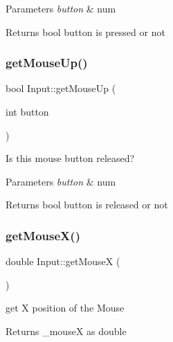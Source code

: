 \begin{DoxyParams}{Parameters}
{\em button} & num \\
\hline
\end{DoxyParams}
\begin{DoxyReturn}{Returns}
bool button is pressed or not 
\end{DoxyReturn}
\mbox{\label{class_input_ad5c2b0983d6319b90ccbe1103f962736}} 
\subsubsection{\texorpdfstring{get\+Mouse\+Up()}{getMouseUp()}}
{\footnotesize\ttfamily bool Input\+::get\+Mouse\+Up (\begin{DoxyParamCaption}\item[{int}]{button }\end{DoxyParamCaption})\hspace{0.3cm}{\ttfamily [inline]}}



Is this mouse button released? 


\begin{DoxyParams}{Parameters}
{\em button} & num \\
\hline
\end{DoxyParams}
\begin{DoxyReturn}{Returns}
bool button is released or not 
\end{DoxyReturn}
\mbox{\label{class_input_a998ef567ed9101db034b8274b2543e1b}} 
\subsubsection{\texorpdfstring{get\+Mouse\+X()}{getMouseX()}}
{\footnotesize\ttfamily double Input\+::get\+MouseX (\begin{DoxyParamCaption}{ }\end{DoxyParamCaption})\hspace{0.3cm}{\ttfamily [inline]}}



get X position of the Mouse 

\begin{DoxyReturn}{Returns}
\+\_\+mouseX as double 
\end{DoxyReturn}
\mbox{\label{class_input_afdb964d8fffbbc6bab1d3b34648c1543}} 
